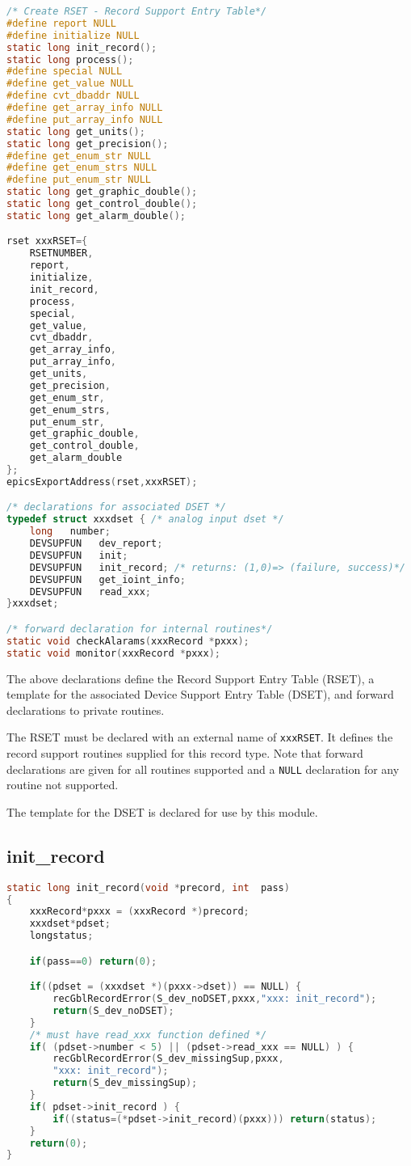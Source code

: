 \begin{lstlisting}[language=C]
/* Create RSET - Record Support Entry Table*/
#define report NULL
#define initialize NULL
static long init_record();
static long process();
#define special NULL
#define get_value NULL
#define cvt_dbaddr NULL
#define get_array_info NULL
#define put_array_info NULL
static long get_units();
static long get_precision();
#define get_enum_str NULL
#define get_enum_strs NULL
#define put_enum_str NULL
static long get_graphic_double();
static long get_control_double();
static long get_alarm_double();

rset xxxRSET={
    RSETNUMBER,
    report,
    initialize,
    init_record,
    process,
    special,
    get_value,
    cvt_dbaddr,
    get_array_info,
    put_array_info,
    get_units,
    get_precision,
    get_enum_str,
    get_enum_strs,
    put_enum_str,
    get_graphic_double,
    get_control_double,
    get_alarm_double
};
epicsExportAddress(rset,xxxRSET);

/* declarations for associated DSET */
typedef struct xxxdset { /* analog input dset */
    long   number;
    DEVSUPFUN   dev_report;
    DEVSUPFUN   init;
    DEVSUPFUN   init_record; /* returns: (1,0)=> (failure, success)*/
    DEVSUPFUN   get_ioint_info;
    DEVSUPFUN   read_xxx;
}xxxdset;

/* forward declaration for internal routines*/
static void checkAlarams(xxxRecord *pxxx);
static void monitor(xxxRecord *pxxx);
\end{lstlisting}

The above declarations define the Record Support Entry Table (RSET), a template for the associated Device Support Entry Table (DSET), and forward declarations to private routines.

The RSET must be declared with an external name of \verb|xxxRSET|. It defines the record support routines supplied for this record type.
Note that forward declarations are given for all routines supported and a \verb|NULL| declaration for any routine not supported.

The template for the DSET is declared for use by this module.

\subsection{init\_record}

\begin{lstlisting}[language=C]
static long init_record(void *precord, int  pass)
{
    xxxRecord*pxxx = (xxxRecord *)precord;
    xxxdset*pdset;
    longstatus;

    if(pass==0) return(0); 

    if((pdset = (xxxdset *)(pxxx->dset)) == NULL) {
        recGblRecordError(S_dev_noDSET,pxxx,"xxx: init_record");
        return(S_dev_noDSET);
    }
    /* must have read_xxx function defined */
    if( (pdset->number < 5) || (pdset->read_xxx == NULL) ) {
        recGblRecordError(S_dev_missingSup,pxxx,
        "xxx: init_record");
        return(S_dev_missingSup);
    }
    if( pdset->init_record ) {
        if((status=(*pdset->init_record)(pxxx))) return(status);
    }
    return(0);
}
\end{lstlisting}

